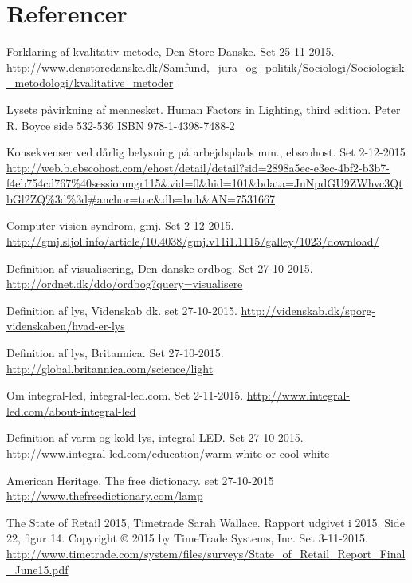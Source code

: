 \section{Referencer}

\begin{thebibliography}{99}


  Forklaring af kvalitativ metode,
  Den Store Danske.
  Set 25-11-2015.
  \url{http://www.denstoredanske.dk/Samfund,_jura_og_politik/Sociologi/Sociologisk_metodologi/kvalitative_metoder}

  Lysets påvirkning af mennesket.
  Human Factors in Lighting, third edition.
  Peter R. Boyce
  side 532-536
  ISBN 978-1-4398-7488-2

  Konsekvenser ved dårlig belysning på arbejdsplads mm.,
  ebscohost.
  Set 2-12-2015
  \url{http://web.b.ebscohost.com/ehost/detail/detail?sid=2898a5ec-e3ec-4bf2-b3b7-f4eb754cd767%40sessionmgr115&vid=0&hid=101&bdata=JnNpdGU9ZWhvc3QtbGl2ZQ%3d%3d#anchor=toc&db=buh&AN=7531667}
  
  Computer vision syndrom,
  gmj.
  Set 2-12-2015.
  \url{http://gmj.sljol.info/article/10.4038/gmj.v11i1.1115/galley/1023/download/}
  
  Definition af visualisering,
  Den danske ordbog.
  Set 27-10-2015.
  \url{http://ordnet.dk/ddo/ordbog?query=visualisere}
  
  Definition af lys,
  Videnskab dk.
  set 27-10-2015.
  \url{http://videnskab.dk/sporg-videnskaben/hvad-er-lys}
  
  Definition af lys,
  Britannica.
  Set 27-10-2015.
  \url{http://global.britannica.com/science/light}

  Om integral-led,
  integral-led.com.
  Set 2-11-2015.
  \url{http://www.integral-led.com/about-integral-led}
  
  Definition af varm og kold lys,
  integral-LED.
  Set 27-10-2015.
  \url{http://www.integral-led.com/education/warm-white-or-cool-white}

  American Heritage,
  The free dictionary.
  set 27-10-2015
  \url{http://www.thefreedictionary.com/lamp}

  The State of Retail 2015,
  Timetrade
  Sarah Wallace.
  Rapport udgivet i 2015.
  Side 22, figur 14.
  Copyright © 2015 by TimeTrade Systems, Inc.
  Set 3-11-2015.
  \url{http://www.timetrade.com/system/files/surveys/State_of_Retail_Report_Final_June15.pdf}


\end{thebibliography}
